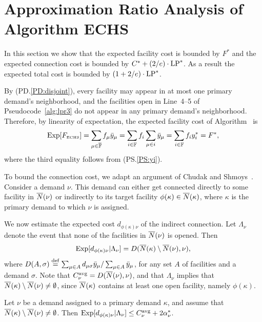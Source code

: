 \documentclass[11pt]{article}
\begin{document}
\section{Approximation Ratio Analysis of Algorithm ECHS}
\label{app: 1.736 analysis}
In this section we show that the expected facility cost is bounded by
$F^\ast$ and the expected connection cost is bounded by $C^\ast +
(2/e) \cdot \mbox{\rm LP}^\ast$. As a result the expected total cost is bounded
by $(1 + 2/e)\cdot \mbox{\rm LP}^\ast$.

By (PD.\ref{PD:disjoint}), every facility may appear in at most one
primary demand's neighborhood, and the facilities open in Line~4--5 of
Pseudocode~\ref{alg:lpr3} do not appear in any primary demand's
neighborhood. Therefore, by linearity of expectation, the expected
facility cost of Algorithm~{\ECHS} is
%
\begin{equation*}
\mbox{\rm Exp}[F_{\mbox{\tiny\rm ECHS}}] 
	= \sum_{\mu\in\overline{\mathbb{F}}} f_\mu {\bar y}_{\mu} 
	= \sum_{i\in\mathbb{F}} f_i\sum_{\mu\in i} {\bar y}_{\mu} 
	= \sum_{i\in\mathbb{F}} f_i y_i^\ast = F^\ast,
\end{equation*}
%
where the third equality follows from (PS.\ref{PS:yi}).

\smallskip

To bound the connection cost, we adapt an argument of Chudak
and Shmoys~\cite{ChudakS04}. Consider a demand $\nu$. This
demand can either get connected directly to some facility in
${\overline{N}}(\nu)$ or indirectly to its target facility $\phi(\kappa)\in
{\overline{N}}(\kappa)$, where $\kappa$ is the primary demand to
which $\nu$ is assigned.

We now estimate the expected cost $d_{\phi(\kappa)\nu}$ of the indirect
connection. Let $\Lambda_\nu$ denote the event that none of the
facilities in ${\overline{N}}(\nu)$ is opened. Then
%
\begin{equation*}
	\mbox{\rm Exp}[ d_{\phi(\kappa)\nu} | \Lambda_\nu] 
			= D({\overline{N}}(\kappa) \setminus {\overline{N}}(\nu), \nu),
\end{equation*}
%
where $D(A,\sigma) \stackrel{\mathrm{def}}{=}\sum_{\mu\in A}
d_{\mu\sigma}{\bar y}_{\mu}/\sum_{\mu\in A} {\bar y}_{\mu}$, for
any set $A$ of facilities and a demand $\sigma$.
Note that $C^{{\mbox{\scriptsize\rm avg}}}_\nu = D({\overline{N}}(\nu),\nu)$,
and that $\Lambda_\nu$ implies that ${\overline{N}}(\kappa) \setminus {\overline{N}}(\nu)\neq\emptyset$,
since ${\overline{N}}(\kappa)$ contains at least one open facility, namely $\phi(\kappa)$.


\begin{lemma}
  \label{lem:echu indirect}
  Let $\nu$ be a demand assigned to a primary demand $\kappa$, and
assume that ${\overline{N}}(\kappa) \setminus {\overline{N}}(\nu)\neq\emptyset$.
Then $\mbox{\rm Exp}[ d_{\phi(\kappa)\nu} | \Lambda_\nu]  \leq
  		C^{{\mbox{\scriptsize\rm avg}}}_\nu+2\alpha_{\nu}^\ast$.
\end{lemma}
\end{document}
